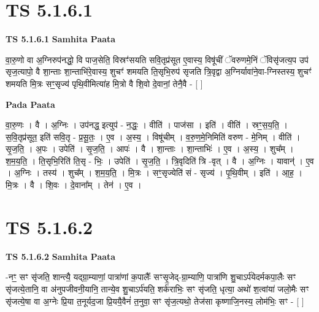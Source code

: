 \documentclass[17pt]{extarticle}
\begin{document}
\section*{ TS 5.1.6.1 }

\textbf{TS 5.1.6.1 } \newline
\textbf{Samhita Paata} \newline

वा॒रु॒णो वा अ॒ग्निरुप॑नद्धो॒ वि पाज॒सेति॒ विस्रꣳ॑सयति सवि॒तृप्र॑सूत ए॒वास्य॒ विषू॑चीं ॅवरुणमे॒निं ॅविसृ॑जत्य॒प उप॑ सृज॒त्यापो॒ वै शा॒न्ताः शा॒न्ताभि॑रे॒वास्य॒ शुचꣳ॑ शमयति ति॒सृभि॒रुप॑ सृजति त्रि॒वृद्वा अ॒ग्निर्यावा॑ने॒वा-ग्निस्तस्य॒ शुचꣳ॑ शमयति मि॒त्रः सꣳ॒॒सृज्य॑ पृथि॒वीमित्या॑ह मि॒त्रो वै शि॒वो दे॒वानां॒ तेनै॒वै - [  ] \newline

\textbf{Pada Paata} \newline

वा॒रु॒णः । वै । अ॒ग्निः । उप॑नद्ध॒ इत्युप॑ - न॒द्धः॒ । वीति॑ । पाज॑सा । इति॑ । वीति॑ । स्रꣳ॒॒स॒य॒ति॒ । स॒वि॒तृप्र॑सूत॒ इति॑ सवि॒तृ - प्र॒सू॒तः॒ । ए॒व । अ॒स्य॒ । विषू॑चीम् । व॒रु॒ण॒मे॒निमिति॑ वरुण - मे॒निम् । वीति॑ । सृ॒ज॒ति॒ । अ॒पः । उपेति॑ । सृ॒ज॒ति॒ । आपः॑ । वै । शा॒न्ताः । शा॒न्ताभिः॑ । ए॒व । अ॒स्य॒ । शुच᳚म् । श॒म॒य॒ति॒ । ति॒सृभि॒रिति॑ ति॒सृ - भिः॒ । उपेति॑ । सृ॒ज॒ति॒ । त्रि॒वृदिति॑ त्रि -वृत् । वै । अ॒ग्निः । यावान्॑ । ए॒व । अ॒ग्निः । तस्य॑ । शुच᳚म् । श॒म॒य॒ति॒ । मि॒त्रः । सꣳ॒॒सृज्येति॑ सं - सृज्य॑ । पृ॒थि॒वीम् । इति॑ । आ॒ह॒ । मि॒त्रः । वै । शि॒वः । दे॒वाना᳚म् । तेन॑ । ए॒व ।  \newline




\section*{ TS 5.1.6.2 }

\textbf{TS 5.1.6.2 } \newline
\textbf{Samhita Paata} \newline

-नꣳ॒॒ सꣳ सृ॑जति॒ शान्त्यै॒ यद्ग्रा॒म्याणां॒ पात्रा॑णां क॒पालैः᳚ सꣳसृ॒जेद्-ग्रा॒म्याणि॒ पात्रा॑णि शु॒चाऽर्प॑येदर्मकपा॒लैः सꣳ सृ॑जत्ये॒तानि॒ वा अ॑नुपजीवनी॒यानि॒ तान्ये॒व शु॒चाऽर्प॑यति॒ शर्क॑राभिः॒ सꣳ सृ॑जति॒ धृत्या॒ अथो॑ श॒त्वांया॑ जलो॒मैः सꣳ सृ॑जत्ये॒षा वा अ॒ग्नेः प्रि॒या त॒नूर्यद॒जा प्रि॒ययै॒वैनं॑ त॒नुवा॒ सꣳ सृ॑ज॒त्यथो॒ तेज॑सा कृष्णाजि॒नस्य॒ लोम॑भिः॒ सꣳ - [  ] \newline
\end{document}
